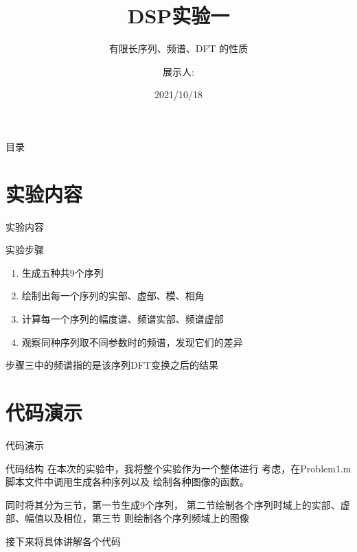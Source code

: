 \documentclass{beamer}
\title {DSP实验一}
\subtitle {有限长序列、频谱、DFT 的性质}
\author {展示人: }
\institute {信电学院} %
\date {2021/10/18}
\begin{document}
\begin{frame}
    \titlepage
\end{frame}
\begin{frame}{目录}
    \tableofcontents
\end{frame}

\section{实验内容}
\begin{frame}{实验内容}
    \begin{block}{实验步骤} 
        \begin{enumerate}
            \item 生成五种共9个序列
            \item 绘制出每一个序列的实部、虚部、模、相角
            \item 计算每一个序列的幅度谱、频谱实部、频谱虚部
            \item 观察同种序列取不同参数时的频谱，发现它们的差异
        \end{enumerate}
    \end{block}

    \hspace*{\fill} 
    
    \begin{alertblock}{}
        步骤三中的频谱指的是该序列DFT变换之后的结果
    \end{alertblock}
    
\end{frame}

\section{代码演示}
\begin{frame}{代码演示}
   \begin{block}{代码结构}
    在本次的实验中，我将整个实验作为一个整体进行
    考虑，在Problem1.m脚本文件中调用生成各种序列以及
    绘制各种图像的函数。
   \end{block}
   \begin{block}{}
    同时将其分为三节，第一节生成9个序列，
    第二节绘制各个序列时域上的实部、虚部、幅值以及相位，第三节
    则绘制各个序列频域上的图像
   \end{block}
   \hspace*{\fill} 
   \begin{alertblock}{}
    \centering
       接下来将具体讲解各个代码
   \end{alertblock}
\end{frame}
\end{document}
